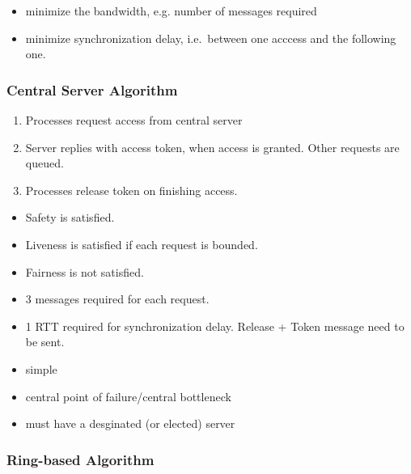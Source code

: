 \documentclass[twocolumn,landscape,10pt]{article}
\theoremstyle{definition}
\begin{document}
\noindent{}

\begin{itemize}
    \item minimize the bandwidth, e.g. number of messages required
    \item minimize synchronization delay, i.e.\ between one acccess and the
        following one.
\end{itemize} 

\subsubsection{Central Server Algorithm}

\begin{enumerate}
    \item Processes request access from central server
    \item Server replies with access token, when access is granted. Other
        requests are queued.
    \item Processes release token on finishing access.
\end{enumerate} 


\begin{itemize}
    \item Safety is satisfied.
    \item Liveness is satisfied if each request is bounded.
    \item Fairness is not satisfied.
\end{itemize} 


\begin{itemize}
    \item 3 messages required for each request.
    \item 1 RTT required for synchronization delay. Release + Token message need
        to be sent.
\end{itemize} 


\begin{itemize}
    \item simple
    \item central point of failure/central bottleneck
    \item must have a desginated (or elected) server
\end{itemize} 

\subsubsection{Ring-based Algorithm}
\end{document}
